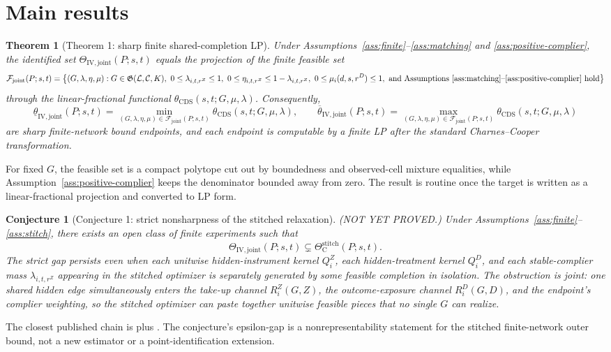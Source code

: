 \documentclass[11pt]{article}
\newcommand{\calF}{\mathcal{F}}
\theoremstyle{definition}
\theoremstyle{plain}
\newtheorem{theorem}{Theorem}
\newtheorem{conjecture}{Conjecture}
\theoremstyle{remark}
\begin{document}
\section{Main results}
\begin{theorem}[Theorem 1: sharp finite shared-completion LP]\label{thm:lp}
Under Assumptions~\ref{ass:finite}--\ref{ass:matching} and \ref{ass:positive-complier}, the identified set
\(\Theta_{\mathrm{IV,joint}}(P;s,t)\) equals the projection of the finite feasible set
\[
\calF_{\mathrm{joint}}(P;s,t)
=
\left\{
(G,\lambda,\eta,\mu):
G\in\mathfrak G(\mathcal L,\mathcal C,K),\
0\le\lambda_{i,t,r^Z}\le1,\
0\le\eta_{i,t,r^Z}\le1-\lambda_{i,t,r^Z},\
0\le\mu_i(d,s,r^D)\le1,
\text{ and Assumptions~\ref{ass:matching}--\ref{ass:positive-complier} hold}
\right\}
\]
through the linear-fractional functional \(\theta_{\mathrm{CDS}}(s,t;G,\mu,\lambda)\). Consequently,
\[
\underline\theta_{\mathrm{IV,joint}}(P;s,t)
=
\min_{(G,\lambda,\eta,\mu)\in\calF_{\mathrm{joint}}(P;s,t)}
\theta_{\mathrm{CDS}}(s,t;G,\mu,\lambda),
\qquad
\overline\theta_{\mathrm{IV,joint}}(P;s,t)
=
\max_{(G,\lambda,\eta,\mu)\in\calF_{\mathrm{joint}}(P;s,t)}
\theta_{\mathrm{CDS}}(s,t;G,\mu,\lambda)
\]
are sharp finite-network bound endpoints, and each endpoint is computable by a finite LP after the standard Charnes--Cooper transformation.
\end{theorem}
For fixed \(G\), the feasible set is a compact polytope cut out by boundedness and observed-cell mixture equalities, while Assumption~\ref{ass:positive-complier} keeps the denominator bounded away from zero. The result is routine once the target is written as a linear-fractional projection and converted to LP form.

\begin{conjecture}[Conjecture 1: strict nonsharpness of the stitched relaxation]\label{conj:strict}
(NOT YET PROVED.) Under Assumptions~\ref{ass:finite}--\ref{ass:stitch}, there exists an open class of finite experiments such that
\[
\Theta_{\mathrm{IV,joint}}(P;s,t)\subsetneq \Theta_{\mathrm{C}}^{\mathrm{stitch}}(P;s,t).
\]
The strict gap persists even when each unitwise hidden-instrument kernel \(Q_i^Z\), each hidden-treatment kernel \(Q_i^D\), and each stable-complier mass \(\lambda_{i,t,r^Z}\) appearing in the stitched optimizer is separately generated by some feasible completion in isolation. The obstruction is joint: one shared hidden edge simultaneously enters the take-up channel \(R_i^Z(G,Z)\), the outcome-exposure channel \(R_i^D(G,D)\), and the endpoint's complier weighting, so the stitched optimizer can paste together unitwise feasible pieces that no single \(G\) can realize.
\end{conjecture}
The closest published chain is \citet{hoshino_yanagi_2024_noncompliance_unknown_interference} plus \citet{schroder_oprescu_feuerriegel_kallus_2026_networks_partialid}. The conjecture's epsilon-gap is a nonrepresentability statement for the stitched finite-network outer bound, not a new estimator or a point-identification extension.
\end{document}
